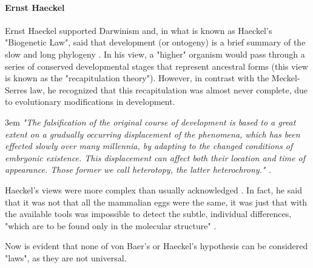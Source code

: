 \begin{mdframed}[style=boxstyle,frametitle={Box2. Haeckel, von Baer and the \textit{Naturphilosophie}}]
\paragraph{Ernst Haeckel}
Ernst Haeckel supported Darwinism and, in what is known as Haeckel's "Biogenetic Law", said that development (or ontogeny) is a brief summary of the slow and long phylogeny \citep{haeckel1874menschen}.
In his view, a "higher" organism would pass through a series of conserved developmental stages that represent ancestral forms (this view is known as the "recapitulation theory").
However, in contrast with the Meckel-Serres law, he recognized that this recapitulation was almost never complete, due to evolutionary modifications in development. 
\begin{flushleft}
\leftskip3em
\rightskip\leftskip
\footnotesize{
\textit{"The falsification of the original course of development is based to a great extent on a gradually occurring displacement of the phenomena, which has been effected slowly over many millennia, by adapting to the changed conditions of embryonic existence. This displacement can affect both their location and time of appearance. Those former we call heterotopy, the latter heterochrony." \citep{haeckel1903anthropogenie}.}}
\end{flushleft}
Haeckel's views were more complex than usually acknowledged \citep{Richardson2002}.
In fact, he said that it was not that all the mammalian eggs were the same, it was just that with the available tools was impossible to detect the subtle, individual differences, "which are to be found only in the molecular structure" \citep{haeckel1903anthropogenie}.

Now is evident that none of von Baer's or Haeckel's hypothesis can be considered "laws", as they are not universal.


\end{mdframed}
